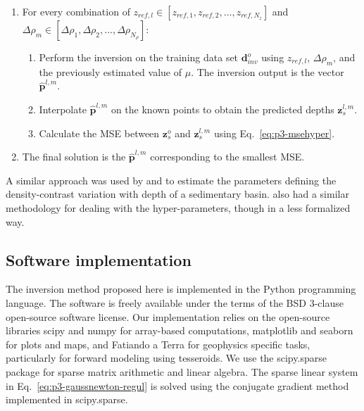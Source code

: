 \begin{enumerate}
    \item For every combination of
        $z_{ref,l} \in [z_{ref,1},z_{ref,2},\ldots,z_{ref,N_z}]$ and
        $\Delta\rho_m \in
         [\Delta\rho_1,\Delta\rho_2,\ldots,\Delta\rho_{N_{\rho}}]$:
    \begin{enumerate}
        \item Perform the inversion on the training data set
            $\mathbf{d}^o_{inv}$ using $z_{ref,l}$, $\Delta\rho_m$, and
            the previously estimated value of $\mu$.
            The inversion output is the vector $\mathbf{\hat{p}}^{l,m}$.
        \item Interpolate $\mathbf{\hat{p}}^{l,m}$
            on the known points to obtain the predicted depths
            $\mathbf{z}_s^{l,m}$.
        \item Calculate the MSE between $\mathbf{z}_s^o$ and
            $\mathbf{z}_s^{l,m}$ using Eq.~\ref{eq:p3-msehyper}.
    \end{enumerate}
    \item The final solution is the $\mathbf{\hat{p}}^{l,m}$ corresponding to
        the smallest MSE.
\end{enumerate}

A similar approach was used by \citet{silva2006} and \citet{martins2010}
to estimate the parameters defining
the density-contrast variation with depth
of a sedimentary basin.
\citet{vandermeijde2013} also had
a similar methodology for dealing with the hyper-parameters,
though in a less formalized way.



\subsection{Software implementation}\label{sec:p3-software}

The inversion method proposed here is implemented in the Python programming
language.
The software is freely available
under the terms of the BSD 3-clause open-source software license.
Our implementation relies on the open-source libraries
scipy and numpy \citep[][ \url{http://scipy.org}]{jones2001}
for array-based computations,
matplotlib \citep[][ \url{http://matplotlib.org}]{hunter2007}
and seaborn
\citep[][ \url{http://stanford.edu/~mwaskom/software/seaborn}]{waskom2015}
for plots and maps,
and Fatiando a Terra \citep[][ \url{http://www.fatiando.org}]{uieda2013a}
for geophysics specific tasks,
particularly for forward modeling using tesseroids.
We use the scipy.sparse package for sparse matrix arithmetic and linear
algebra.
The sparse linear system in Eq.~\ref{eq:p3-gaussnewton-regul}
is solved using the conjugate gradient method implemented in scipy.sparse.

